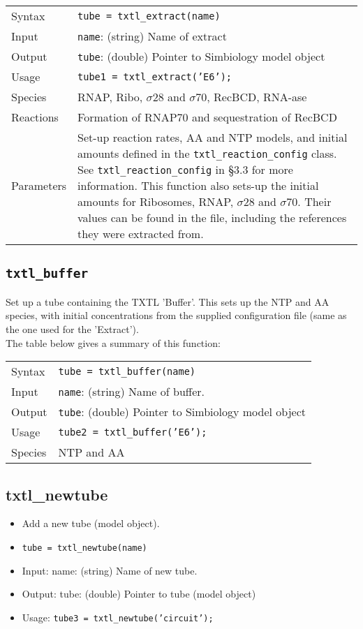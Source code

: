 \documentclass[english]{report}
\begin{document}
			\begin{tabular}{p{2cm}|p{8cm}}
			Syntax & \texttt{tube = txtl\_extract(name)}\\
			Input & \texttt{name}: (string) Name of extract \\
			Output & \texttt{tube}: (double) Pointer to Simbiology model object\\
			Usage & \texttt{tube1 = txtl\_extract('E6');}\\
			Species & RNAP, Ribo, $\sigma 28$ and $\sigma 70$, RecBCD, RNA-ase \\
			Reactions & Formation of RNAP70 and sequestration of RecBCD \\
			Parameters & Set-up reaction rates, AA and NTP models, and initial amounts defined in the \texttt{txtl\_reaction\_config} class. See \texttt{txtl\_reaction\_config} in \S 3.3 for more information. This function also sets-up the initial amounts for Ribosomes, RNAP,  $\sigma 28$ and $\sigma 70$. Their values can be found in the file, including the references they were extracted from. \\
			\end{tabular}
			
		\subsection*{\texttt{txtl\_buffer}}
		Set up a tube containing the TXTL 'Buffer'. This sets up the NTP and AA species, with initial concentrations from the supplied configuration file (same as the one used for the 'Extract'). \\
		
		The table below gives a summary of this function:
			
			\begin{tabular}{p{2cm}|p{8cm}}
			Syntax & \texttt{tube = txtl\_buffer(name)}\\
			Input & \texttt{name}: (string) Name of buffer. \\
			Output & \texttt{tube}: (double) Pointer to Simbiology model object\\
			Usage & \texttt{tube2 = txtl\_buffer('E6');}\\
			Species & NTP and AA \\
			\end{tabular}			
		\subsection*{txtl\_newtube}		
			\begin{itemize}
			\item Add a new tube (model object).
			\item \texttt{tube = txtl\_newtube(name)}
			\item Input: name: (string) Name of new tube. 
			\item Output: tube: (double) Pointer to tube (model object)
			\item Usage: \texttt{tube3 = txtl\_newtube('circuit');} 
			\end{itemize}					
\end{document}
